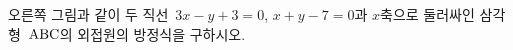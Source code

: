 \noindent\begin{minipage}[t]{0.58\linewidth}\vspace{0pt}\raggedright 오른쪽 그림과 같이 두 직선~$3x-y+3=0$, $x+y-7=0$과 $x$축으로 둘러싸인 삼각형~$\mathrm{ABC}$의 외접원의 방정식을 구하시오.\end{minipage}\hfill\begin{minipage}[t]{0.4\linewidth}\vspace{0pt}\centering \resizebox{\ifdim\width>\linewidth\linewidth\else\width\fi}{!}{}\end{minipage}\par
